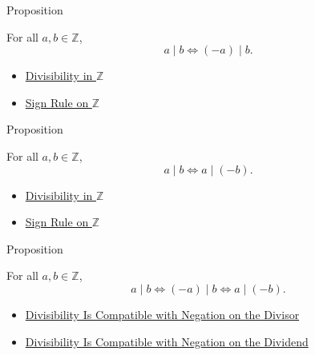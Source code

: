 \begin{propositionbox}{Proposition}
\begin{proposition}
\label{prop:divisibility-compatible-with-negation-divisor-on-z}
For all $a,b\in\mathbb{Z}$,
\[
a\mid b \Longleftrightarrow (-a)\mid b.
\]
\end{proposition}
\end{propositionbox}

\begin{dependencies}
\begin{itemize}
  \item \hyperref[def:divisibility-in-z]{Divisibility in $\mathbb{Z}$}
  \item \hyperref[cor:sign-rule-on-z]{Sign Rule on $\mathbb{Z}$}
\end{itemize}
\end{dependencies}

\begin{propositionbox}{Proposition}
\begin{proposition}
\label{prop:divisibility-compatible-with-negation-dividend-on-z}
For all $a,b\in\mathbb{Z}$,
\[
a\mid b \Longleftrightarrow a\mid(-b).
\]
\end{proposition}
\end{propositionbox}

\begin{dependencies}
\begin{itemize}
  \item \hyperref[def:divisibility-in-z]{Divisibility in $\mathbb{Z}$}
  \item \hyperref[cor:sign-rule-on-z]{Sign Rule on $\mathbb{Z}$}
\end{itemize}
\end{dependencies}

\begin{propositionbox}{Proposition}
\begin{proposition}
\label{prop:divisibility-compatible-with-negation-on-z}
For all $a,b\in\mathbb{Z}$,
\[
a\mid b \Longleftrightarrow (-a)\mid b \Longleftrightarrow a\mid(-b).
\]
\end{proposition}
\end{propositionbox}

\begin{dependencies}
\begin{itemize}
  \item \hyperref[prop:divisibility-compatible-with-negation-divisor-on-z]{Divisibility Is Compatible with Negation on the Divisor}
  \item \hyperref[prop:divisibility-compatible-with-negation-dividend-on-z]{Divisibility Is Compatible with Negation on the Dividend}
\end{itemize}
\end{dependencies}

